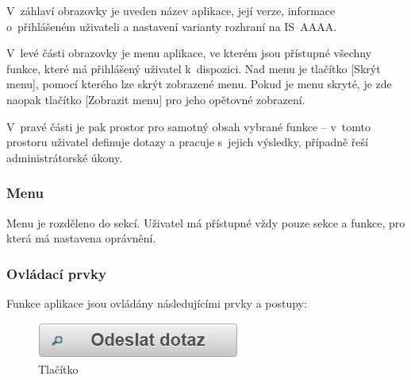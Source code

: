 \documentclass[thesis=M,czech]{FITthesis}[2019/12/23]
\begin{document}
V~záhlaví obrazovky je uveden název aplikace, její verze, informace o~přihlášeném uživateli a nastavení varianty rozhraní na IS~AAAA.

V~levé části obrazovky je menu aplikace, ve kterém jsou přístupné všechny funkce, které má přihlášený uživatel k~dispozici. Nad menu je tlačítko [Skrýt menu], pomocí kterého lze skrýt zobrazené menu. Pokud je menu skryté, je zde naopak tlačítko [Zobrazit menu] pro jeho opětovné zobrazení.

V~pravé části je pak prostor pro samotný obsah vybrané funkce – v~tomto prostoru uživatel definuje dotazy a pracuje s~jejich výsledky, případně řeší administrátorské úkony.

\subsubsection{Menu}
Menu je rozděleno do sekcí. Uživatel má přístupné vždy pouze sekce a funkce, pro která má nastavena oprávnění.

\newpage
\subsubsection{Ovládací prvky}
\label{OvladaciPrvky}
Funkce aplikace jsou ovládány následujícími prvky a postupy:

\begin{figure}[H]
  \centering
  \includegraphics[scale=0.5]{res/guide/Button.png}
  \caption{Tlačítko}
  \label{fig:Tlačítko}
\end{figure}
\end{document}
